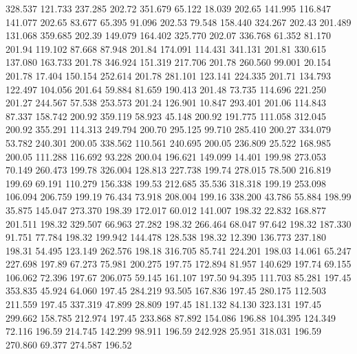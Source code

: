  328.537  121.733  237.285       202.72
 351.679   65.122   18.039       202.65
 141.995  116.847  141.077       202.65
  83.677   65.395   91.096       202.53
  79.548  158.440  324.267       202.43
 201.489  131.068  359.685       202.39
 149.079  164.402  325.770       202.07
 336.768   61.352   81.170       201.94
 119.102   87.668   87.948       201.84
 174.091  114.431  341.131       201.81
 330.615  137.080  163.733       201.78
 346.924  151.319  217.706       201.78
 260.560   99.001   20.154       201.78
  17.404  150.154  252.614       201.78
 281.101  123.141  224.335       201.71
 134.793  122.497  104.056       201.64
  59.884   81.659  190.413       201.48
  73.735  114.696  221.250       201.27
 244.567   57.538  253.573       201.24
 126.901   10.847  293.401       201.06
 114.843   87.337  158.742       200.92
 359.119   58.923   45.148       200.92
 191.775  111.058  312.045       200.92
 355.291  114.313  249.794       200.70
 295.125   99.710  285.410       200.27
 334.079   53.782  240.301       200.05
 338.562  110.561  240.695       200.05
 236.809   25.522  168.985       200.05
 111.288  116.692   93.228       200.04
 196.621  149.099   14.401       199.98
 273.053   70.149  260.473       199.78
 326.004  128.813  227.738       199.74
 278.015   78.500  216.819       199.69
  69.191  110.279  156.338       199.53
 212.685   35.536  318.318       199.19
 253.098  106.094  206.759       199.19
  76.434   73.918  208.004       199.16
 338.200   43.786   55.884       198.99
  35.875  145.047  273.370       198.39
 172.017   60.012  141.007       198.32
  22.832  168.877  201.511       198.32
 329.507   66.963   27.282       198.32
 266.464   68.047   97.642       198.32
 187.330   91.751   77.784       198.32
 199.942  144.478  128.538       198.32
  12.390  136.773  237.180       198.31
  54.495  123.149  262.576       198.18
 316.705   85.741  224.201       198.03
  14.061   65.247  227.698       197.89
  67.273   75.981  200.275       197.75
 172.894   81.957  140.629       197.74
  69.155  106.062   72.396       197.67
 206.075   59.145  161.107       197.50
  94.395  111.703   85.281       197.45
 353.835   45.924   64.060       197.45
 284.219   93.505  167.836       197.45
 280.175  112.503  211.559       197.45
 337.319   47.899   28.809       197.45
 181.132   84.130  323.131       197.45
 299.662  158.785  212.974       197.45
 233.868   87.892  154.086       196.88
 104.395  124.349   72.116       196.59
 214.745  142.299   98.911       196.59
 242.928   25.951  318.031       196.59
 270.860   69.377  274.587       196.52

